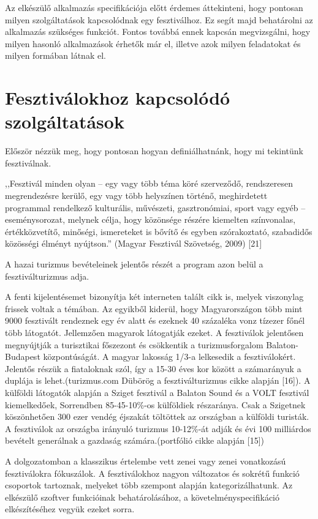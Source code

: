 
Az elkészülő alkalmazás specifikációja előtt érdemes áttekinteni, hogy pontosan milyen szolgáltatások kapcsolódnak egy fesztiválhoz. Ez segít majd behatárolni az alkalmazás szükséges funkciót. Fontos továbbá ennek kapcsán megvizsgálni, hogy milyen hasonló alkalmazások érhetők már el, illetve azok milyen feladatokat és milyen formában látnak el.

\section{Fesztiválokhoz kapcsolódó szolgáltatások}

Először nézzük meg, hogy pontosan hogyan definiálhatnánk, hogy mi tekintünk fesztiválnak.

,,Fesztivál minden olyan – egy vagy több téma köré szerveződő, rendszeresen megrendezésre kerülő, egy vagy több helyszínen történő, meghirdetett programmal rendelkező kulturális, művészeti, gasztronómiai, sport vagy egyéb – eseménysorozat, melynek célja, hogy közönsége részére kiemelten színvonalas, értékközvetítő, minőségi, ismereteket is bővítő és egyben szórakoztató, szabadidős közösségi élményt nyújtson.'' (Magyar Fesztivál Szövetség, 2009) [21]

A hazai turizmus bevételeinek jelentős részét a program azon belül a fesztiválturizmus adja.

A fenti kijelentésemet bizonyítja két interneten talált cikk is, melyek viszonylag frissek voltak a témában. Az egyikből kiderül, hogy Magyarországon több mint 9000 fesztivált rendeznek egy év alatt és ezeknek 40 százaléka vonz tízezer főnél több látogatót. Jellemzően magyarok látogatják ezeket. A fesztiválok jelentősen megnyújtják a turisztikai főszezont és csökkentik a turizmusforgalom Balaton-Budapest központúságát. A magyar lakosság 1/3-a lelkesedik a fesztiválokért. Jelentős részük a fiataloknak szól, így a 15-30 éves kor között a számarányuk a duplája is lehet.(turizmus.com Dübörög a fesztiválturizmus cikke alapján [16]). 
A külföldi látogatók alapján a Sziget fesztivál a Balaton Sound és a VOLT fesztivál kiemelkedőek, Sorrendben 85-45-10\%-os külföldiek részaránya. Csak a Szigetnek köszönhetően 300 ezer vendég éjszakát töltöttek az országban a külföldi turisták. A fesztiválok az országba irányuló turizmus 10-12\%-át adják és évi 100 milliárdos bevételt generálnak a gazdaság számára.(portfólió cikke alapján [15])

A dolgozatomban a klasszikus értelembe vett zenei vagy zenei vonatkozású fesztiválokra fókuszálok.
A fesztiválokhoz nagyon változatos és sokrétű funkció csoportok tartoznak, melyeket több szempont alapján kategorizálhatunk. Az elkészülő szoftver funkcióinak behatárolásához, a követelményspecifikáció elkészítéséhez vegyük ezeket sorra.

